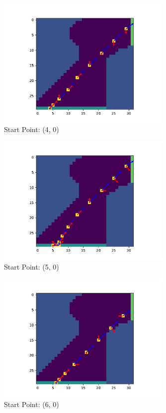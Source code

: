 \documentclass{article}
\begin{document}
\begin{figure}[H]
	\centering
	\includegraphics[width=0.75\textwidth]{../figure/fig_4}
	\caption{Start Point: (4, 0)}
	\label{fig:fig_4}
\end{figure}

\begin{figure}[H]
	\centering
	\includegraphics[width=0.75\textwidth]{../figure/fig_5}
	\caption{Start Point: (5, 0)}
	\label{fig:fig_5}
\end{figure}

\begin{figure}[H]
	\centering
	\includegraphics[width=0.75\textwidth]{../figure/fig_6}
	\caption{Start Point: (6, 0)}
	\label{fig:fig_6}
\end{figure}
\end{document}
